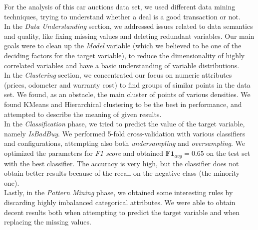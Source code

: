 \documentclass{article}
\begin{document}
	For the analysis of this car auctions data set, we used different data mining techniques, trying to understand whether a deal is a good transaction or not. \\
	In the \emph{Data Understanding} section, we addressed issues related to data semantics and quality, like fixing missing values and deleting redundant variables. Our main goals were to clean up the \emph{Model} variable (which we believed to be one of the deciding factors for the target variable), to reduce the dimensionality of highly correlated variables and have a basic understanding of variable distributions.\\
	In the \emph{Clustering} section, we concentrated our focus on numeric attributes (prices, odometer and warranty cost) to find groups of similar points in the data set. We found, as an obstacle, the main cluster of points of various densities. We found KMeans and Hierarchical clustering to be the best in performance, and attempted to describe the meaning of given results.\\
	In the \emph{Classification} phase, we tried to predict the value of the target variable, namely \emph{IsBadBuy}. We performed 5-fold cross-validation with various classifiers and configurations, attempting also both \emph{undersampling} and \emph{oversampling}. We optimized the parameters for \emph{F1 score} and obtained $\mathbf{F1}_{avg} = 0.65$ on the test set with the best classifier. The accuracy is very high, but the classifier does not obtain better results because of the recall on the negative class (the minority one).  \\
	Lastly, in the \emph{Pattern Mining} phase, we obtained some interesting rules by discarding highly imbalanced categorical attributes. We were able to obtain decent results both when attempting to predict the target variable and when replacing the missing values.
	
\end{document}
